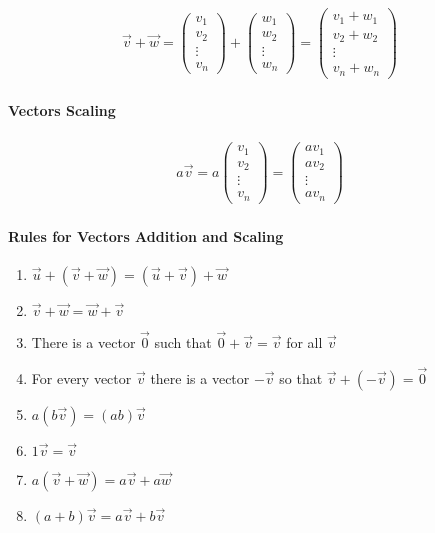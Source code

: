 \begin{align*}
	\vec{v}+\vec{w}=\begin{pmatrix}
	v_1 \\ v_2 \\ \vdots \\ v_n
	\end{pmatrix}+\begin{pmatrix}
	w_1 \\ w_2 \\ \vdots \\ w_n
	\end{pmatrix}=\begin{pmatrix}
	v_1+w_1 \\ v_2+w_2 \\ \vdots \\ v_n+w_n
	\end{pmatrix}
\end{align*}

\paragraph{Vectors Scaling}

\begin{align*}
	a\vec{v}=a\begin{pmatrix}
	v_1 \\ v_2 \\ \vdots \\ v_n
	\end{pmatrix}=\begin{pmatrix}
	av_1 \\ av_2 \\ \vdots \\ av_n
	\end{pmatrix}
\end{align*}

\paragraph{Rules for Vectors Addition and Scaling}

\begin{enumerate}
	\item $\vec{u}+\left(\vec{v}+\vec{w}\right)=\left(\vec{u}+\vec{v}\right)+\vec{w}$
	\item $\vec{v}+\vec{w}=\vec{w}+\vec{v}$
	\item There is a vector $\vec{0}$ such that $\vec{0}+\vec{v}=\vec{v}$ for all $\vec{v}$
	\item For every vector $\vec{v}$ there is a vector $-\vec{v}$ so that $\vec{v}+\left(-\vec{v}\right)=\vec{0}$
	\item $a\left(b\vec{v}\right)=\left(ab\right)\vec{v}$
	\item $1\vec{v}=\vec{v}$
	\item $a\left(\vec{v}+\vec{w}\right)=a\vec{v}+a\vec{w}$
	\item $\left(a+b\right)\vec{v}=a\vec{v}+b\vec{v}$
\end{enumerate}

